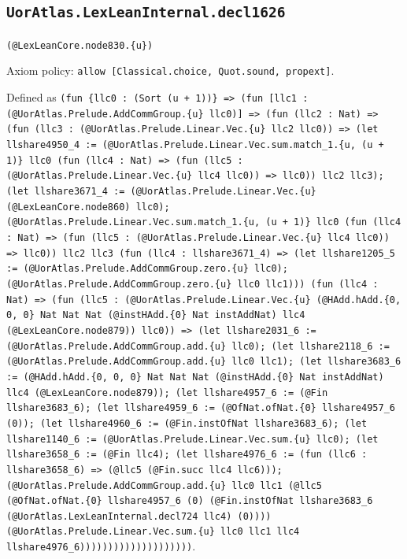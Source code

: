 \documentclass[11pt]{article}
\begin{document}
\subsection*{\texttt{UorAtlas.LexLeanInternal.decl1626}}
\noindent\texttt{(@LexLeanCore.node830.\{u\})}\par
\noindent Axiom policy: \texttt{allow [Classical.choice, Quot.sound, propext]}.\par
\noindent Defined as \texttt{(fun \{llc0 : (Sort (u + 1))\} => (fun [llc1 : (@UorAtlas.Prelude.AddCommGroup.\{u\} llc0)] => (fun (llc2 : Nat) => (fun (llc3 : (@UorAtlas.Prelude.Linear.Vec.\{u\} llc2 llc0)) => (let llshare4950\_4 := (@UorAtlas.Prelude.Linear.Vec.sum.match\_1.\{u, (u + 1)\} llc0 (fun (llc4 : Nat) => (fun (llc5 : (@UorAtlas.Prelude.Linear.Vec.\{u\} llc4 llc0)) => llc0)) llc2 llc3); (let llshare3671\_4 := (@UorAtlas.Prelude.Linear.Vec.\{u\} (@LexLeanCore.node860) llc0); (@UorAtlas.Prelude.Linear.Vec.sum.match\_1.\{u, (u + 1)\} llc0 (fun (llc4 : Nat) => (fun (llc5 : (@UorAtlas.Prelude.Linear.Vec.\{u\} llc4 llc0)) => llc0)) llc2 llc3 (fun (llc4 : llshare3671\_4) => (let llshare1205\_5 := (@UorAtlas.Prelude.AddCommGroup.zero.\{u\} llc0); (@UorAtlas.Prelude.AddCommGroup.zero.\{u\} llc0 llc1))) (fun (llc4 : Nat) => (fun (llc5 : (@UorAtlas.Prelude.Linear.Vec.\{u\} (@HAdd.hAdd.\{0, 0, 0\} Nat Nat Nat (@instHAdd.\{0\} Nat instAddNat) llc4 (@LexLeanCore.node879)) llc0)) => (let llshare2031\_6 := (@UorAtlas.Prelude.AddCommGroup.add.\{u\} llc0); (let llshare2118\_6 := (@UorAtlas.Prelude.AddCommGroup.add.\{u\} llc0 llc1); (let llshare3683\_6 := (@HAdd.hAdd.\{0, 0, 0\} Nat Nat Nat (@instHAdd.\{0\} Nat instAddNat) llc4 (@LexLeanCore.node879)); (let llshare4957\_6 := (@Fin llshare3683\_6); (let llshare4959\_6 := (@OfNat.ofNat.\{0\} llshare4957\_6 (0)); (let llshare4960\_6 := (@Fin.instOfNat llshare3683\_6); (let llshare1140\_6 := (@UorAtlas.Prelude.Linear.Vec.sum.\{u\} llc0); (let llshare3658\_6 := (@Fin llc4); (let llshare4976\_6 := (fun (llc6 : llshare3658\_6) => (@llc5 (@Fin.succ llc4 llc6))); (@UorAtlas.Prelude.AddCommGroup.add.\{u\} llc0 llc1 (@llc5 (@OfNat.ofNat.\{0\} llshare4957\_6 (0) (@Fin.instOfNat llshare3683\_6 (@UorAtlas.LexLeanInternal.decl724 llc4) (0)))) (@UorAtlas.Prelude.Linear.Vec.sum.\{u\} llc0 llc1 llc4 llshare4976\_6))))))))))))))))))))}.\par
\end{document}
